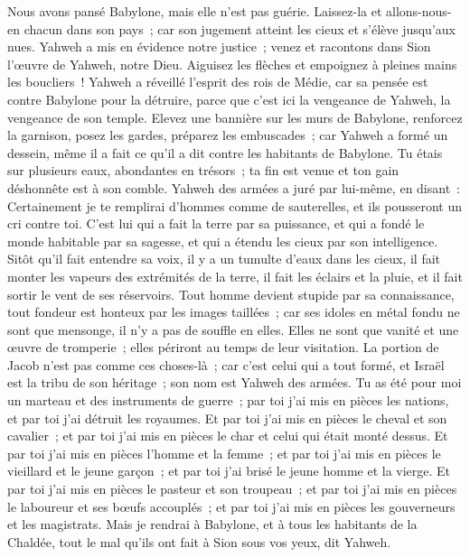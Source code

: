 \begin{multicols}{2}
Nous avons pansé Babylone, mais elle n'est pas guérie. Laissez-la et allons-nous-en chacun dans son pays~; car son jugement atteint les cieux et s'élève jusqu'aux nues.
Yahweh a mis en évidence notre justice~; venez et racontons dans Sion l'œuvre de Yahweh, notre Dieu.
Aiguisez les flèches et empoignez à pleines mains les boucliers~! Yahweh a réveillé l'esprit des rois de Médie, car sa pensée est contre Babylone pour la détruire, parce que c'est ici la vengeance de Yahweh, la vengeance de son temple.
Elevez une bannière sur les murs de Babylone, renforcez la garnison, posez les gardes, préparez les embuscades~; car Yahweh a formé un dessein, même il a fait ce qu'il a dit contre les habitants de Babylone.
Tu étais sur plusieurs eaux, abondantes en trésors~; ta fin est venue et ton gain déshonnête est à son comble.
Yahweh des armées a juré par lui-même, en disant~: Certainement je te remplirai d'hommes comme de sauterelles, et ils pousseront un cri contre toi.
C'est lui qui a fait la terre par sa puissance, et qui a fondé le monde habitable par sa sagesse, et qui a étendu les cieux par son intelligence.
Sitôt qu'il fait entendre sa voix, il y a un tumulte d'eaux dans les cieux, il fait monter les vapeurs des extrémités de la terre, il fait les éclairs et la pluie, et il fait sortir le vent de ses réservoirs.
Tout homme devient stupide par sa connaissance, tout fondeur est honteux par les images taillées~; car ses idoles en métal fondu ne sont que mensonge, il n'y a pas de souffle en elles.
Elles ne sont que vanité et une œuvre de tromperie~; elles périront au temps de leur visitation.
La portion de Jacob n'est pas comme ces choses-là~; car c'est celui qui a tout formé, et Israël est la tribu de son héritage~; son nom est Yahweh des armées.
Tu as été pour moi un marteau et des instruments de guerre~; par toi j'ai mis en pièces les nations, et par toi j'ai détruit les royaumes.
Et par toi j'ai mis en pièces le cheval et son cavalier~; et par toi j'ai mis en pièces le char et celui qui était monté dessus.
Et par toi j'ai mis en pièces l'homme et la femme~; et par toi j'ai mis en pièces le vieillard et le jeune garçon~; et par toi j'ai brisé le jeune homme et la vierge.
Et par toi j'ai mis en pièces le pasteur et son troupeau~; et par toi j'ai mis en pièces le laboureur et ses bœufs accouplés~; et par toi j'ai mis en pièces les gouverneurs et les magistrats.
Mais je rendrai à Babylone, et à tous les habitants de la Chaldée, tout le mal qu'ils ont fait à Sion sous vos yeux, dit Yahweh.

\end{multicols}
